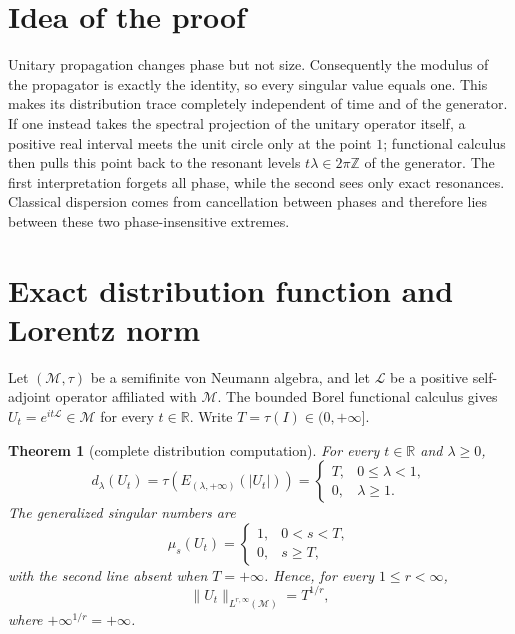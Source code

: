 \documentclass[11pt]{article}
\newtheorem{theorem}{Theorem}
\newcommand{\M}{\mathcal M}
\newcommand{\Lcal}{\mathcal L}
\begin{document}
\section*{Idea of the proof}

Unitary propagation changes phase but not size.  Consequently the modulus of
the propagator is exactly the identity, so every singular value equals one.
This makes its distribution trace completely independent of time and of the
generator.  If one instead takes the spectral projection of the unitary
operator itself, a positive real interval meets the unit circle only at the
point $1$; functional calculus then pulls this point back to the resonant
levels $t\lambda\in2\pi\mathbb Z$ of the generator.  The first interpretation
forgets all phase, while the second sees only exact resonances.  Classical
dispersion comes from cancellation between phases and therefore lies between
these two phase-insensitive extremes.

\section{Exact distribution function and Lorentz norm}

Let $(\M,\tau)$ be a semifinite von Neumann algebra, and let $\Lcal$ be a
positive self-adjoint operator affiliated with $\M$.  The bounded Borel
functional calculus gives $U_t=e^{it\Lcal}\in\M$ for every $t\in\mathbb R$.
Write $T=\tau(I)\in(0,+\infty]$.

\begin{theorem}[complete distribution computation]\label{thm:distribution}
For every $t\in\mathbb R$ and $\lambda\ge0$,
\begin{equation}\label{eq:step}
 d_\lambda(U_t)
 =\tau\!\left(E_{(\lambda,+\infty)}(|U_t|)\right)
 =
 \begin{cases}
 T,&0\le\lambda<1,\\
 0,&\lambda\ge1.
 \end{cases}
\end{equation}
The generalized singular numbers are
\[
 \mu_s(U_t)=
 \begin{cases}
 1,&0<s<T,\\
 0,&s\ge T,
 \end{cases}
\]
with the second line absent when $T=+\infty$.  Hence, for every
$1\le r<\infty$,
\begin{equation}\label{eq:weaknorm}
 \|U_t\|_{L^{r,\infty}(\M)}=T^{1/r},
\end{equation}
where $+\infty^{1/r}=+\infty$.
\end{theorem}
\end{document}
